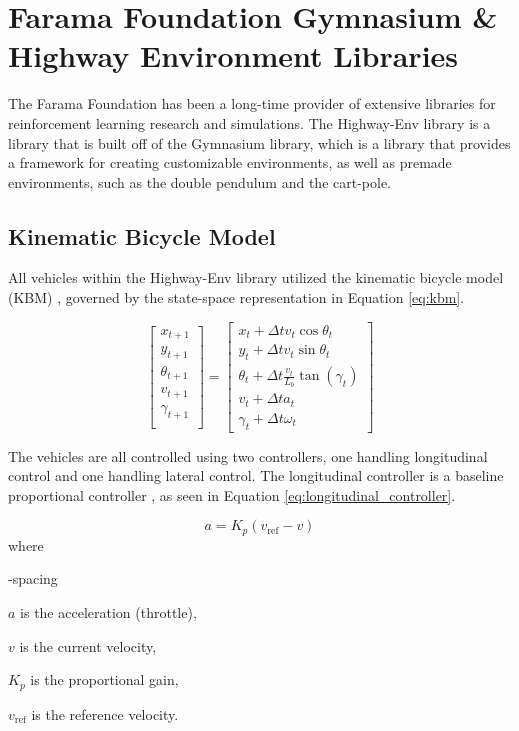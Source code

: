 \documentclass[12pt, a4paper]{report}
\begin{document}
\section{Farama Foundation Gymnasium \& Highway Environment Libraries}

The Farama Foundation has been a long-time provider of extensive libraries for reinforcement learning research and simulations. The Highway-Env library \cite{highway-env} is a library that is built off of the Gymnasium library, which is a library that provides a framework for creating customizable environments, as well as premade environments, such as the double pendulum and the cart-pole.

\subsection{Kinematic Bicycle Model}

All vehicles within the Highway-Env library utilized the kinematic bicycle model (KBM) \cite{polack2017kinematic}, governed by the state-space representation in Equation \ref{eq:kbm}.

\begin{equation}
    \begin{bmatrix}
        x_{t+1} \\
        y_{t+1} \\
        \theta_{t+1} \\
        v_{t+1} \\
        \gamma_{t+1} \\
    \end{bmatrix} =
    \begin{bmatrix}
        x_t + \Delta tv_t\cos{\theta_{t}} \\
        y_t + \Delta tv_t\sin{\theta_{t}} \\
        \theta_t + \Delta t\frac{v_t}{L_b}\tan(\gamma_t) \\
        v_t + \Delta ta_t\ \\
        \gamma_t + \Delta t \omega_t
    \end{bmatrix}
    \label{eq:kbm}
\end{equation}


The vehicles are all controlled using two controllers, one handling longitudinal control and one handling lateral control. The longitudinal controller is a baseline proportional controller \cite{highway-env}, as seen in Equation \ref{eq:longitudinal_controller}. 

\begin{equation}
    a = K_p(v_{\text{ref}} - v)
    \label{eq:longitudinal_controller}
\end{equation}
where
\begin{list}{-}{spacing}
    \item $a$ is the acceleration (throttle),
    \item $v$ is the current velocity,
    \item $K_p$ is the proportional gain,
    \item $v_{\text{ref}}$ is the reference velocity.
\end{list}
\end{document}
